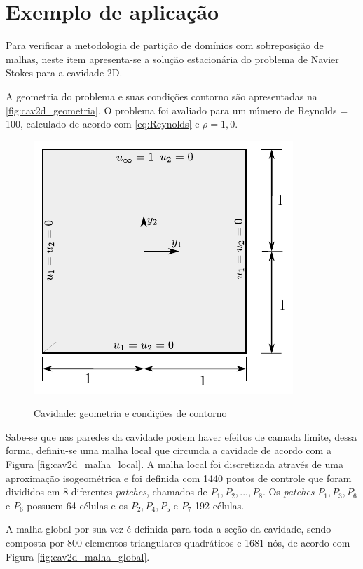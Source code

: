 \section{Exemplo de aplicação} \label{capitulo:cap5:Exemplo}

Para verificar a metodologia de partição de domínios com sobreposição de malhas, neste item apresenta-se a solução estacionária do problema de Navier Stokes para a cavidade 2D.

A geometria do problema e suas condições contorno são apresentadas na \autoref{fig:cav2d_geometria}. O problema foi avaliado para um número de Reynolds = 100, calculado de acordo com \autoref{eq:Reynolds} e $\rho = 1,0$.

\begin{figure}[!htbp]
	\caption{Cavidade: geometria e condições de contorno} 
	\centering
	{\includegraphics[scale=1.3,trim=0cm 0cm 0cm 0cm, clip=true]{Imagens/Cap5/cav2d_geometria.pdf}}
	\label{fig:cav2d_geometria}
\end{figure}

Sabe-se que nas paredes da cavidade podem haver efeitos de camada limite, dessa forma, definiu-se uma malha local que circunda a cavidade de acordo com a Figura \ref{fig:cav2d_malha_local}. A malha local foi discretizada através de uma aproximação isogeométrica e foi definida com 1440 pontos de controle que foram divididos em 8 diferentes \textit{patches}, chamados de $P_{1},P_{2},...,P_{8}$. Os \textit{patches} $P_{1},P_{3},P_{6}$ e $P_{6}$ possuem 64 células e os $P_{2},P_{4},P_{5}$ e $P_{7}$ 192 células.

A malha global por sua vez é definida para toda a seção da cavidade, sendo composta por 800 elementos triangulares quadráticos e 1681 nós, de acordo com Figura \ref{fig:cav2d_malha_global}.

